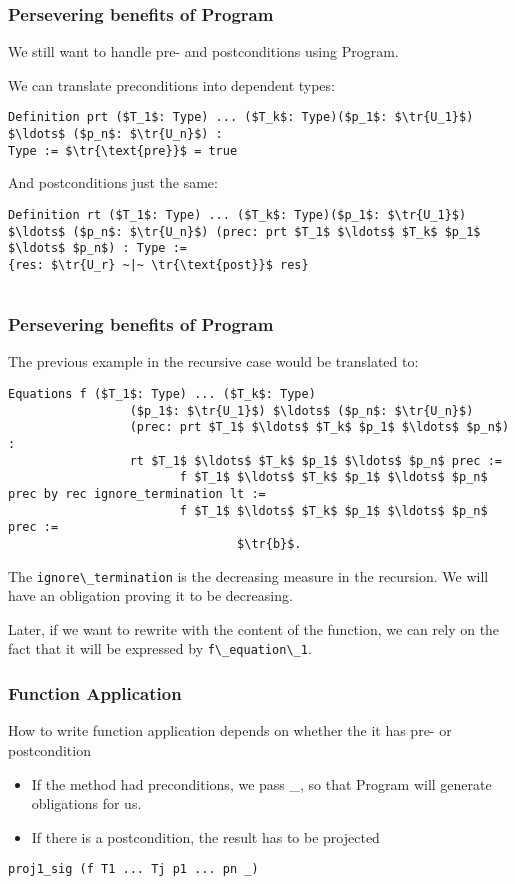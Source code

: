 \documentclass{beamer}
\newcommand{\tr}[1]{[#1]}
\newcommand{\coqInline}[1]{\lstinline[style=myCoqStyle]|#1|}
\begin{document}
\begin{frame}[fragile]
	\frametitle{Persevering benefits of Program}
	We still want to handle pre- and postconditions using Program.
	
	We can translate preconditions into dependent types:
	\begin{lstlisting}[style=myCoqstyle]  
Definition prt ($T_1$: Type) ... ($T_k$: Type)($p_1$: $\tr{U_1}$) $\ldots$ ($p_n$: $\tr{U_n}$) :
Type := $\tr{\text{pre}}$ = true
	\end{lstlisting}
	
	And postconditions just the same:
	\begin{lstlisting}[style=myCoqstyle] 
Definition rt ($T_1$: Type) ... ($T_k$: Type)($p_1$: $\tr{U_1}$) $\ldots$ ($p_n$: $\tr{U_n}$) (prec: prt $T_1$ $\ldots$ $T_k$ $p_1$ $\ldots$ $p_n$) : Type :=
{res: $\tr{U_r} ~|~ \tr{\text{post}}$ res}
	
	\end{lstlisting}
\end{frame}

\begin{frame}[fragile]
	\frametitle{Persevering benefits of Program}
	The previous example in the recursive case would be translated to:
	
	\begin{lstlisting}[style=myCoqstyle]
Equations f ($T_1$: Type) ... ($T_k$: Type)
			     ($p_1$: $\tr{U_1}$) $\ldots$ ($p_n$: $\tr{U_n}$) 
			     (prec: prt $T_1$ $\ldots$ $T_k$ $p_1$ $\ldots$ $p_n$) : 
			     rt $T_1$ $\ldots$ $T_k$ $p_1$ $\ldots$ $p_n$ prec :=
						f $T_1$ $\ldots$ $T_k$ $p_1$ $\ldots$ $p_n$ prec by rec ignore_termination lt :=
						f $T_1$ $\ldots$ $T_k$ $p_1$ $\ldots$ $p_n$ prec :=
								$\tr{b}$.
	\end{lstlisting}
	
	The \coqInline{ignore\_termination} is the decreasing measure in the recursion. We will have an obligation proving it to be decreasing.
	
	Later, if we want to rewrite with the content of the function, we can rely on the fact that it will be expressed by \coqInline{f\_equation\_1}.
	
\end{frame}


\begin{frame}[fragile]
	\frametitle{Function Application}
	
	How to write function application depends on whether the it has pre- or postcondition
	
	\begin{itemize}
		\item If the method had preconditions, we pass \_, so that Program will generate obligations for us.
		\item If there is a postcondition, the result has to be projected
	\end{itemize}

\begin{lstlisting}[style=myCoqstyle]  
proj1_sig (f T1 ... Tj p1 ... pn _)
\end{lstlisting}

\end{frame}
\end{document}
